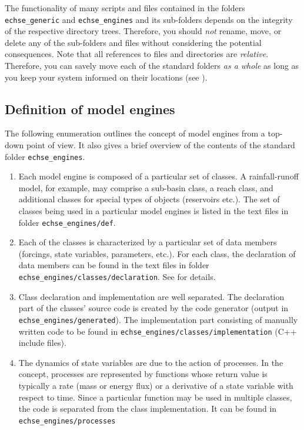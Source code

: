 The functionality of many scripts and files contained in the folders \verb!echse_generic! and \verb!echse_engines! and its sub-folders depends on the integrity of the respective directory trees. Therefore, you should \emph{not} rename, move, or delete any of the sub-folders and files without considering the potential consequences. Note that all references to files and directories are \emph{relative}. Therefore, you can savely move each of the  standard folders \emph{as a whole} as long as you keep your system informed on their locations (see ).


\subsection{Definition of model engines} \label{sec:install:folders:engines}

The following enumeration outlines the concept of model engines from a top-down point of view. It also gives a brief overview of the contents of the  standard folder \verb!echse_engines!.

\begin{enumerate}
  \item Each model engine is composed of a particular set of classes. A rainfall-runoff model, for example, may comprise a sub-basin class, a reach class, and additional classes for special types of objects (reservoirs etc.). The set of classes being used in a particular model engines is listed in the text files in folder \verb!echse_engines/def!.
  \item Each of the classes is characterized by a particular set of data members (forcings, state variables, parameters, etc.). For each class, the declaration of data members can be found in the text files in folder \verb!echse_engines/classes/declaration!. See \citet{Echse-Main-Doc} for details.
  \item Class declaration and implementation are well separated. The declaration part of the classes' source code is created by the code generator (output in \verb!echse_engines/generated!). The implementation part consisting of manually written code to be found in \verb!echse_engines/classes/implementation! (C++ include files).
  \item The dynamics of state variables are due to the action of processes. In the  concept, processes are represented by functions whose return value is typically a rate (mass or energy flux) or a derivative of a state variable with respect to time. Since a particular function may be used in multiple classes, the code is separated from the class implementation. It can be found in \verb!echse_engines/processes!
\end{enumerate}

